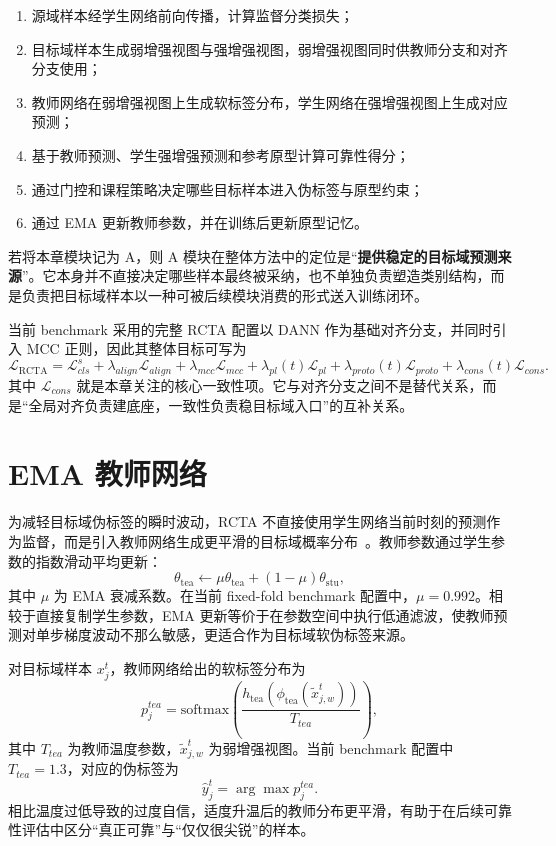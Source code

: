 \begin{enumerate}
\item 源域样本经学生网络前向传播，计算监督分类损失；
\item 目标域样本生成弱增强视图与强增强视图，弱增强视图同时供教师分支和对齐分支使用；
\item 教师网络在弱增强视图上生成软标签分布，学生网络在强增强视图上生成对应预测；
\item 基于教师预测、学生强增强预测和参考原型计算可靠性得分；
\item 通过门控和课程策略决定哪些目标样本进入伪标签与原型约束；
\item 通过 EMA 更新教师参数，并在训练后更新原型记忆。
\end{enumerate}

若将本章模块记为 A，则 A 模块在整体方法中的定位是“\textbf{提供稳定的目标域预测来源}”。它本身并不直接决定哪些样本最终被采纳，也不单独负责塑造类别结构，而是负责把目标域样本以一种可被后续模块消费的形式送入训练闭环。

当前 benchmark 采用的完整 RCTA 配置以 DANN 作为基础对齐分支，并同时引入 MCC 正则，因此其整体目标可写为
\begin{equation}
\mathcal{L}_{\mathrm{RCTA}}=
\mathcal{L}_{cls}^{s}
+\lambda_{align}\mathcal{L}_{align}
+\lambda_{mcc}\mathcal{L}_{mcc}
+\lambda_{pl}(t)\mathcal{L}_{pl}
+\lambda_{proto}(t)\mathcal{L}_{proto}
+\lambda_{cons}(t)\mathcal{L}_{cons}.
\end{equation}
其中 $\mathcal{L}_{cons}$ 就是本章关注的核心一致性项。它与对齐分支之间不是替代关系，而是“全局对齐负责建底座，一致性负责稳目标域入口”的互补关系。

\section{EMA 教师网络}
为减轻目标域伪标签的瞬时波动，RCTA 不直接使用学生网络当前时刻的预测作为监督，而是引入教师网络生成更平滑的目标域概率分布~\cite{tarvainen2017meanteacher}。教师参数通过学生参数的指数滑动平均更新：
\begin{equation}
\theta_{\mathrm{tea}}\leftarrow
\mu \theta_{\mathrm{tea}}+(1-\mu)\theta_{\mathrm{stu}},
\end{equation}
其中 $\mu$ 为 EMA 衰减系数。在当前 fixed-fold benchmark 配置中，$\mu=0.992$。相较于直接复制学生参数，EMA 更新等价于在参数空间中执行低通滤波，使教师预测对单步梯度波动不那么敏感，更适合作为目标域软伪标签来源。

对目标域样本 $x_j^t$，教师网络给出的软标签分布为
\begin{equation}
p_{j}^{tea}=
\mathrm{softmax}\!\left(
\frac{h_{\mathrm{tea}}(\phi_{\mathrm{tea}}(\tilde{x}_{j,w}^{t}))}{T_{tea}}
\right),
\end{equation}
其中 $T_{tea}$ 为教师温度参数，$\tilde{x}_{j,w}^{t}$ 为弱增强视图。当前 benchmark 配置中 $T_{tea}=1.3$，对应的伪标签为
\begin{equation}
\hat{y}_{j}^{t}=\arg\max p_j^{tea}.
\end{equation}
相比温度过低导致的过度自信，适度升温后的教师分布更平滑，有助于在后续可靠性评估中区分“真正可靠”与“仅仅很尖锐”的样本。

